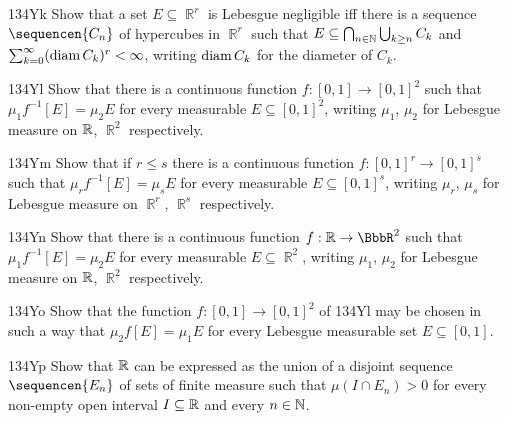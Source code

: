 {\spheader 134Yk Show that a set $E\subseteq\BbbR^r$ is Lebesgue
negligible iff there is a sequence $\sequencen{C_n}$ of hypercubes in
$\BbbR^r$ such that $E\subseteq\bigcap_{n\in\Bbb N}\bigcup_{k\ge n}C_k$
and $\sum_{k=0}^{\infty}(\mathop{\text{diam}} C_k)^r<\infty$, writing $\mathop{\text{diam}} C_k$ for
the diameter of $C_k$.
     
\spheader 134Yl Show that there is a continuous function
$f:[0,1]\to[0,1]^2$ such that $\mu_1f^{-1}[E]=\mu_2E$ for every
measurable $E\subseteq[0,1]^2$, writing $\mu_1$, $\mu_2$ for Lebesgue
measure on $\Bbb R$, $\BbbR^2$ respectively.   
     
\spheader 134Ym Show that if $r\le s$ there is a continuous
function $f:[0,1]^r\to[0,1]^s$ such that $\mu_rf^{-1}[E]=\mu_sE$ for
every measurable $E\subseteq[0,1]^s$, writing $\mu_r$, $\mu_s$ for
Lebesgue measure on $\BbbR^r$, $\BbbR^s$ respectively.
     
\spheader 134Yn Show that there is a continuous function
$f:\Bbb R\to\BbbR^2$ such that $\mu_1f^{-1}[E]=\mu_2E$ for every
measurable
$E\subseteq\BbbR^2$, writing $\mu_1$, $\mu_2$ for Lebesgue measure on
$\Bbb R$, $\BbbR^2$ respectively.
     
\spheader 134Yo Show that the function $f:[0,1]\to[0,1]^2$ of
134Yl may be chosen in such a way that $\mu_2f[E]=\mu_1E$ for every
Lebesgue measurable set $E\subseteq[0,1]$.   
     
\spheader 134Yp Show that $\Bbb R$ can be expressed as the union
of a disjoint
sequence $\sequencen{E_n}$ of sets of finite measure such that
$\mu(I\cap E_n)>0$ for every non-empty open interval $I\subseteq\Bbb R$
and every $n\in\Bbb N$.
     
}

